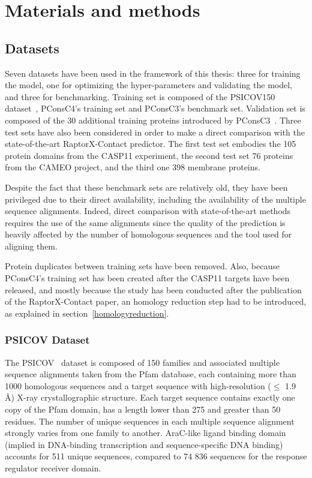 \chapter{Materials and methods}

\section{Datasets}

  Seven datasets have been used in the framework of this thesis:
  three for training the model, one for optimizing the hyper-parameters and validating the model,
  and three for benchmarking. Training set is composed of the
  PSICOV150 dataset~\cite{doi:10.1093/bioinformatics/btr638}, 
  PConsC4's training set and PConsC3's benchmark set. Validation set is composed of the 30 additional
  training proteins introduced by PConsC3~\cite{Skwark079673}.
  Three test sets have also been considered in order to make a direct comparison
  with the state-of-the-art RaptorX-Contact predictor.
  The first test set embodies the 105 protein domains from the CASP11 experiment,
  the second test set 76 proteins from the CAMEO
  project, and the third one 398 membrane proteins.

  Despite the fact that these benchmark sets are relatively old, they have
  been privileged due to their direct availability, including the availability
  of the multiple sequence alignments. Indeed, direct comparison with
  state-of-the-art methods requires the use of the same alignments 
  since the quality of the prediction is heavily affected by the number of homologous
  sequences and the tool used for aligning them.

  Protein duplicates between training sets have been removed. Also, because PConsC4's training set
  has been created after the CASP11 targets have been released, and mostly because the study
  has been conducted after the publication of the RaptorX-Contact paper, an homology reduction
  step had to be introduced, as explained in section~\ref{homologyreduction}.

  \subsection{PSICOV Dataset}

    The PSICOV~\cite{doi:10.1093/bioinformatics/btr638} dataset is composed of 150 families
    and associated multiple sequence alignments
    taken from the Pfam database, each containing more than 1000 homologous sequences
    and a target sequence with high-resolution ($\le$ 1.9 \AA{}) X-ray crystallographic structure.
    Each target sequence contains exactly one copy of the Pfam domain, has a length lower than
    275 and greater than 50 residues. The number of unique sequences in each multiple sequence
    alignment strongly varies from one family to another.
    AraC-like ligand binding domain (implied in DNA-binding transcription and
    sequence-specific DNA binding) accounts for 511 unique sequences, compared to 74 836 sequences
    for the response regulator receiver domain.

